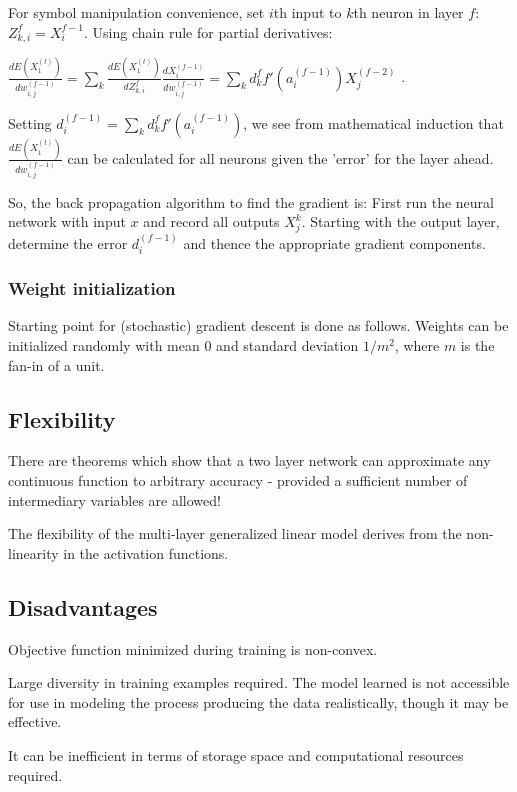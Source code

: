 \documentclass[oneside, article]{memoir}
\begin{document}
For symbol manipulation convenience, set $i$th input to $k$th neuron in layer $f$: $Z_{k, i}^{f} = X_i^{f-1}$. Using chain rule for partial derivatives:

$\frac{dE(X_1^{(t)})}{dw_{i, j}^{(f-1)}} = \sum_k \frac{dE(X_1^{(t)})}{dZ_{k, i}^{f}} \frac{d X_{i}^{(f-1)}}{dw_{i, j}^{(f-1)}}= \sum_k d_k^{f} f'(a_i^{(f-1)})X_{j}^{(f-2)}$ .

Setting $d^{(f-1)}_i = \sum_k d_k^{f} f'(a_i^{(f-1)})$, we see from mathematical induction that $\frac{dE(X_1^{(t)})}{dw_{i, j}^{(f-1)}}$ can be calculated for all neurons given the 'error' for the layer ahead.

So, the back propagation algorithm to find the gradient is: First run the neural network with input $x$ and record all outputs $X_j^{k}$. Starting with the output layer, determine the error $d^{(f-1)}_i$ and thence the appropriate gradient components.

\subsubsection{Weight initialization}
Starting point for (stochastic) gradient descent is done as follows. Weights can be initialized randomly with mean 0 and standard deviation $1/m^2$, where $m$ is the fan-in of a unit.



\subsection{Flexibility}
There are theorems which show that a two layer network can approximate any continuous function to arbitrary accuracy - provided a sufficient number of intermediary variables are allowed!

The flexibility of the multi-layer generalized linear model derives from the non-linearity in the activation functions.

\subsection{Disadvantages}
Objective function minimized during training is non-convex.

Large diversity in training examples required. The model learned is not accessible for use in modeling the process producing the data realistically, though it may be effective.

It can be inefficient in terms of storage space and computational resources required.
\end{document}

